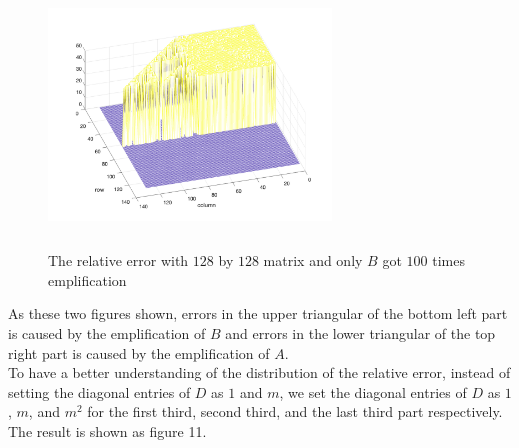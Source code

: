 \documentclass{article}
\begin{document}
\begin{figure}[h]
    \centering
    \includegraphics[width=0.67\textwidth, height = 7cm]{128_100_2_B.png}
    \caption{The relative error with $128$ by $128$ matrix and only $B$ got $100$ times emplification}
\end{figure}

As these two figures shown, errors in the upper triangular of the bottom left part is caused by the emplification of $B$ and errors in the lower triangular
of the top right part is caused by the emplification of $A$.\\

To have a better understanding of the distribution of the relative error, instead of setting the
diagonal entries of $D$ as $1$ and $m$, we set the diagonal entries of $D$ as $1$, $m$, and $m^2$ for the first third, second third, and the last 
third part respectively. The result is shown as figure 11.\\
\end{document}
